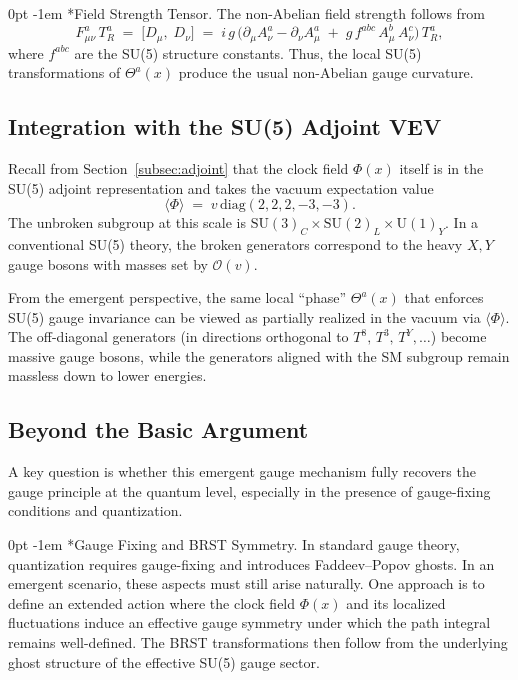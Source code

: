 \documentclass[aps,prd,preprint,groupedaddress]{revtex4-2}
\makeatletter
\renewcommand{\paragraph}[1]{%
  \@startsection{paragraph}{4}{\z@}%
    {0pt}%
    {-1em}%
    {\normalfont\normalsize\itshape}*{#1}}
\makeatother
\begin{document}
\paragraph{Field Strength Tensor.}
The non-Abelian field strength follows from
\begin{equation}
F_{\mu\nu}^a \,T^a_R 
\;=\;
\bigl[D_\mu,\;D_\nu\bigr]
\;=\;
i\,g\,\bigl(\partial_\mu A_\nu^a - \partial_\nu A_\mu^a 
\;+\; g\,f^{abc}\,A_\mu^b\,A_\nu^c\bigr)\,T^a_R,
\label{eq:nonabelian-fmunu}
\end{equation}
where $f^{abc}$ are the SU(5) structure constants. Thus, the local SU(5) transformations of $\Theta^a(x)$ produce the usual non-Abelian gauge curvature.

\subsection{Integration with the SU(5) Adjoint VEV}
\label{subsec:adjoint-vev-integration}

Recall from Section~\ref{subsec:adjoint} that the clock field $\Phi(x)$ itself is in the SU(5) adjoint representation and takes the vacuum expectation value
\[
\langle \Phi\rangle \;=\; v\,\mathrm{diag}(2,2,2,-3,-3).
\]
The unbroken subgroup at this scale is $\mathrm{SU}(3)_C \times \mathrm{SU}(2)_L \times \mathrm{U}(1)_Y$. In a conventional SU(5) theory, the broken generators correspond to the heavy $X,Y$ gauge bosons with masses set by $\mathcal{O}(v)$. 

From the emergent perspective, the same local ``phase'' $\Theta^a(x)$ that enforces SU(5) gauge invariance can be viewed as partially realized in the vacuum via $\langle\Phi\rangle$. The off-diagonal generators (in directions orthogonal to $T^8,\,T^3,\,T^Y,\dots$) become massive gauge bosons, while the generators aligned with the SM subgroup remain massless down to lower energies.

\subsection{Beyond the Basic Argument}
\label{subsec:beyond-basic}

A key question is whether this emergent gauge mechanism fully recovers the gauge principle at the quantum level, especially in the presence of gauge-fixing conditions and quantization.

\paragraph{Gauge Fixing and BRST Symmetry.}
In standard gauge theory, quantization requires gauge-fixing and introduces Faddeev--Popov ghosts. In an emergent scenario, these aspects must still arise naturally.  
One approach is to define an extended action where the clock field $\Phi(x)$ and its localized fluctuations induce an effective gauge symmetry under which the path integral remains well-defined. The BRST transformations then follow from the underlying ghost structure of the effective SU(5) gauge sector.
\end{document}
